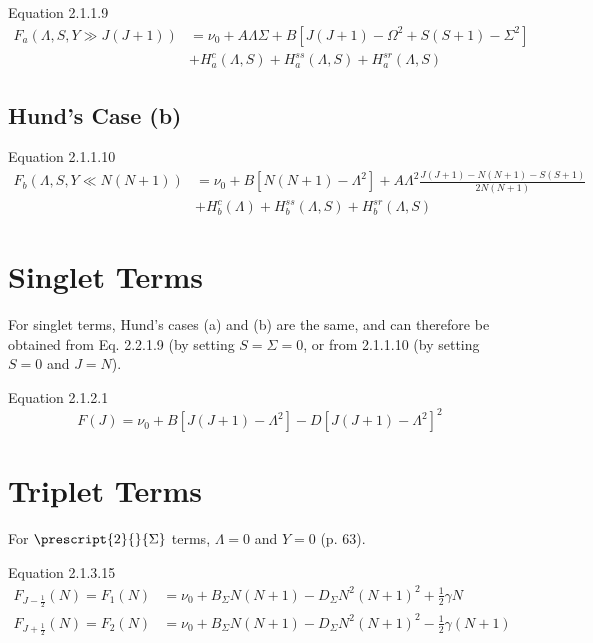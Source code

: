 \documentclass[11pt, twoside, fleqn]{report}
\newcommand{\state}[2]{\prescript{#1}{}{#2}}
\begin{document}
Equation 2.1.1.9
\begin{align*}
    F_{a}(\Lambda, S, Y \gg J(J + 1)) & = \nu_{0} + A\Lambda\Sigma + B[J(J + 1) - \Omega^{2} + S(S + 1) -\Sigma^{2}] \\
    & + H_{a}^{c}(\Lambda, S) + H_{a}^{ss}(\Lambda, S) + H_{a}^{sr}(\Lambda, S)
\end{align*}

\subsection{Hund's Case (b)}

Equation 2.1.1.10
\begin{align*}
    F_{b}(\Lambda, S, Y \ll N(N + 1)) & = \nu_{0} + B[N(N + 1) - \Lambda^{2}] + A\Lambda^{2}\frac{J(J + 1) - N(N + 1) - S(S + 1)}{2N(N + 1)} \\
    & + H_{b}^{c}(\Lambda) + H_{b}^{ss}(\Lambda, S) + H_{b}^{sr}(\Lambda, S)
\end{align*}

\section{Singlet Terms}

For singlet terms, Hund's cases (a) and (b) are the same, and can therefore be obtained from Eq. 2.2.1.9 (by setting $S = \Sigma = 0$, or from 2.1.1.10 (by setting $S = 0$ and $J = N$).

    Equation 2.1.2.1
    \begin{equation*}
        F(J) = \nu_{0} + B[J(J + 1) - \Lambda^{2}] - D[J(J + 1) - \Lambda^{2}]^{2}
    \end{equation*}

    \section{Triplet Terms}

    For $\state{2}{\Sigma}$ terms, $\Lambda = 0$ and $Y = 0$ (p. 63).

    Equation 2.1.3.15
    \begin{align*}
        F_{J - \tfrac{1}{2}}(N) = F_{1}(N) & = \nu_{0} + B_\Sigma N(N + 1) - D_\Sigma N^{2}(N + 1)^{2} + \tfrac{1}{2}\gamma N      \\
        F_{J + \tfrac{1}{2}}(N) = F_{2}(N) & = \nu_{0} + B_\Sigma N(N + 1) - D_\Sigma N^{2}(N + 1)^{2} - \tfrac{1}{2}\gamma(N + 1)
    \end{align*}
\end{document}
